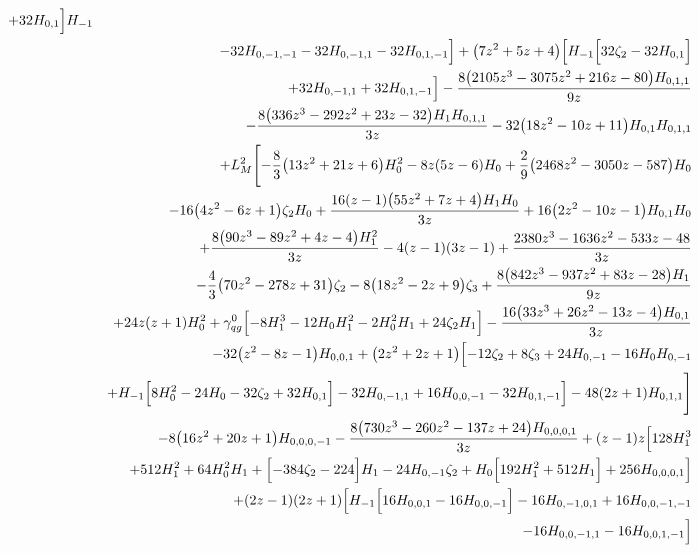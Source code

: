\begin{eqnarray}
+32 H_{0,1}\Bigr] H_{-1}
\nonumber \\ &&
-32 H_{0,-1,-1}-32 H_{0,-1,1}-32 H_{0,1,-1}\Bigr]+\big(7 z^2+5 z+4\big)\Bigl[H_{-1} \Bigl[32  \zeta_2-32  H_{0,1}\Bigr]
\nonumber \\ &&
+32  H_{0,-1,1}+32 H_{0,1,-1}\Bigr]-\frac{8 \big(2105 z^3-3075 z^2+216 z-80\big) H_{0,1,1}}{9  z}
\nonumber \\ &&
-\frac{8 \big(336 z^3-292 z^2+23 z-32\big) H_1 H_{0,1,1}}{3 z}-32 \big(18z^2-10 z+11\big) H_{0,1} H_{0,1,1}
\nonumber \\ &&
+L_M^2 \Biggl[-\frac{8}{3} \big(13 z^2+21 z+6\big)H_0^2-8  z (5 z-6) H_0+\frac{2}{9} \big(2468 z^2-3050 z-587\big) H_0
\nonumber \\ &&
-16\big(4 z^2-6 z+1\big) \zeta_2 H_0+\frac{16 (z-1) \big(55 z^2+7 z+4\big)  H_1 H_0}{3 z}+16 \big(2 z^2-10 z-1\big) H_{0,1} H_0
\nonumber \\ &&
+\frac{8 \big(90 z^3-89 z^2+4 z-4\big) H_1^2}{3 z}-4  (z-1) (3z-1)+\frac{2380 z^3-1636 z^2-533 z-48}{3 z}
\nonumber \\ &&
-\frac{4}{3} \big(70 z^2-278 z+31\big) \zeta_2-8 \big(18 z^2-2z+9\big) \zeta_3
+\frac{8 \big(842 z^3-937 z^2+83  z-28\big) H_1}{9 z}
\nonumber \\ &&
+24 z (z+1) H_0^2
+{\gamma}_{qg}^{0} \Bigl[-8 H_1^3-12 H_0 H_1^2-2H_0^2 H_1+24 \zeta_2 H_1\Bigr]-\frac{16 \big(33 z^3+26 z^2-13 z-4\big)  H_{0,1}}{3 z}
\nonumber \\ &&
-32 \big(z^2-8 z-1\big) H_{0,0,1}+\big(2 z^2+2 z+1\big)\Bigl[-12  \zeta_2+8  \zeta_3+24  H_{0,-1}
-16 H_0 H_{0,-1}
\nonumber \\ &&
+H_{-1} \Bigl[8  H_0^2-24  H_0-32 \zeta_2+32  H_{0,1}\Bigr]
-32  H_{0,-1,1}+16 H_{0,0,-1}-32  H_{0,1,-1}\Bigr]-48 (2 z+1) H_{0,1,1}\Biggr]
\nonumber \\ &&
-8 \big(16z^2+20 z+1\big) H_{0,0,0,-1}-\frac{8 \big(730 z^3-260 z^2-137 z+24\big)  H_{0,0,0,1}}{3 z}+(z-1) z \Bigl[128  H_1^3
\nonumber \\ &&
+512  H_1^2+64 H_0^2 H_1+\Bigl[-384  \zeta_2-224 \Bigr] H_1-24  H_{0,-1}\zeta_2
+H_0 \Bigl[192  H_1^2+512  H_1\Bigr]+256 H_{0,0,0,1}\Bigr]
\nonumber \\ &&
+(2 z-1) (2 z+1) \Bigl[H_{-1} \Bigl[16 H_{0,0,1}-16H_{0,0,-1}\Bigr]
-16 H_{0,-1,0,1}+16 H_{0,0,-1,-1}
\nonumber \\ &&
-16 H_{0,0,-1,1}-16H_{0,0,1,-1}\Bigr]

\end{eqnarray}

